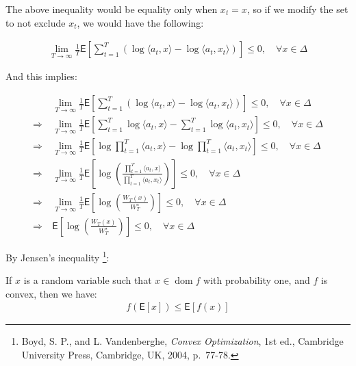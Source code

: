 \documentclass{article}
\DeclareMathOperator{\domain}{dom}
\begin{document}
The above inequality would be equality only when $x_t = x$, so if we modify the set to not exclude $x_t$, we would have the following:

\begin{align*}
    \lim_{T \to \infty} \frac{1}{T} \mathsf{E} \left[ \sum_{t = 1}^T \left( \log \langle a_t, x \rangle - \log \langle a_t, x_t \rangle \right) \right] \leq 0 ,  \quad \forall x \in \Delta 
\end{align*}

And this implies:

\begin{align*}
    &\lim_{T \to \infty} \frac{1}{T} \mathsf{E} \left[ \sum_{t = 1}^T \left( \log \langle a_t, x \rangle - \log \langle a_t, x_t \rangle \right) \right] \leq 0 ,  \quad \forall x \in \Delta \\
    \Rightarrow \ & \lim_{T \to \infty} \frac{1}{T} \mathsf{E} \left[ \sum_{t=1}^T \log \langle a_t, x \rangle - \sum_{t=1}^T \log \langle a_t, x_t \rangle \right] \leq 0 ,  \quad \forall x \in \Delta \\
    \Rightarrow \ & \lim_{T \to \infty} \frac{1}{T} \mathsf{E} \left[ \log \prod_{t=1}^T \langle a_t, x \rangle - \log \prod_{t=1}^T \langle a_t, x_t \rangle \right] \leq 0 ,  \quad \forall x \in \Delta \\
    \Rightarrow \ & \lim_{T \to \infty} \frac{1}{T} \mathsf{E} \left[ \log \left( \frac{\prod_{t=1}^T \langle a_t, x \rangle}{\prod_{t=1}^T \langle a_t, x_t \rangle} \right) \right] \leq 0 ,  \quad \forall x \in \Delta \\
    \Rightarrow \ & \lim_{T \to \infty} \frac{1}{T} \mathsf{E} \left[ \log \left( \frac{W_T (x)}{W_T^\star} \right) \right] \leq 0 ,  \quad \forall x \in \Delta \\
    \Rightarrow \ & \mathsf{E} \left[ \log \left( \frac{W_T (x)}{W_T^\star} \right) \right] \leq 0 ,  \quad \forall x \in \Delta
\end{align*}



By Jensen's inequality
\footnote{Boyd, S. P., and L. Vandenberghe, \textit{Convex Optimization}, 1st ed., Cambridge University Press, Cambridge, UK, 2004, p.~77-78.}:

\begin{tcolorbox}[greenbox, title = Jensen's inequality]
    If $x$ is a random variable such that $x \in \domain f$ with probability one, and $f$ is convex, then we have:
    \begin{align*}
        f \left( \mathsf{E} [x] \right) \leq \mathsf{E} \left[ f (x) \right]
    \end{align*}
\end{tcolorbox}
\end{document}
